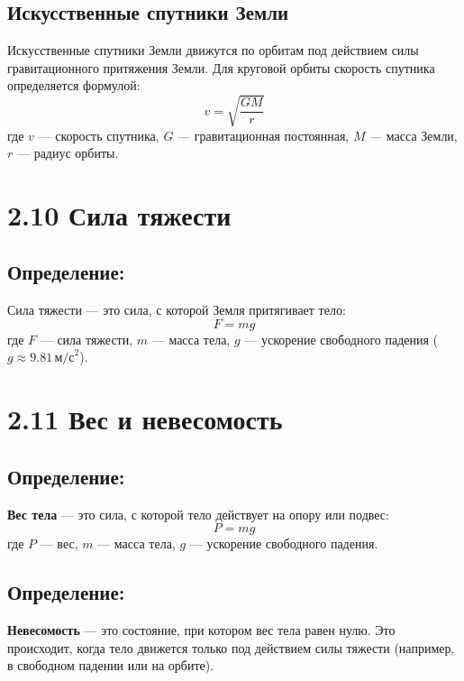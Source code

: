 \documentclass[a4paper, 12pt]{article}
\begin{document}
\vspace{-9pt}
\subsection*{Искусственные спутники Земли}
\vspace{-3pt}
Искусственные спутники Земли движутся по орбитам под действием силы гравитационного притяжения Земли. Для круговой орбиты скорость спутника определяется формулой:
$$ v = \sqrt{\frac{GM}{r}} $$
где $v $ --- скорость спутника, $G $ --- гравитационная постоянная, $M $ --- масса Земли, $r $ --- радиус орбиты.


\section*{2.10 Сила тяжести}

\vspace{-9pt}
\subsection*{Определение:}
\vspace{-3pt}
Сила тяжести --- это сила, с которой Земля притягивает тело:
$$ F = mg $$
где $F $ --- сила тяжести, $m $ --- масса тела, $g $ --- ускорение свободного падения ($g \approx 9.81 \, \text{м/с}^2 $).


\section*{2.11 Вес и невесомость}

\vspace{-9pt}
\subsection*{Определение:}
\vspace{-3pt}
\textbf{Вес тела} --- это сила, с которой тело действует на опору или подвес:
$$ P = mg $$
где $P $ --- вес, $m $ --- масса тела, $g $ --- ускорение свободного падения.

\vspace{-9pt}
\subsection*{Определение:}
\vspace{-3pt}
\textbf{Невесомость} --- это состояние, при котором вес тела равен нулю. Это происходит, когда тело движется только под действием силы тяжести (например, в свободном падении или на орбите).
\end{document}
